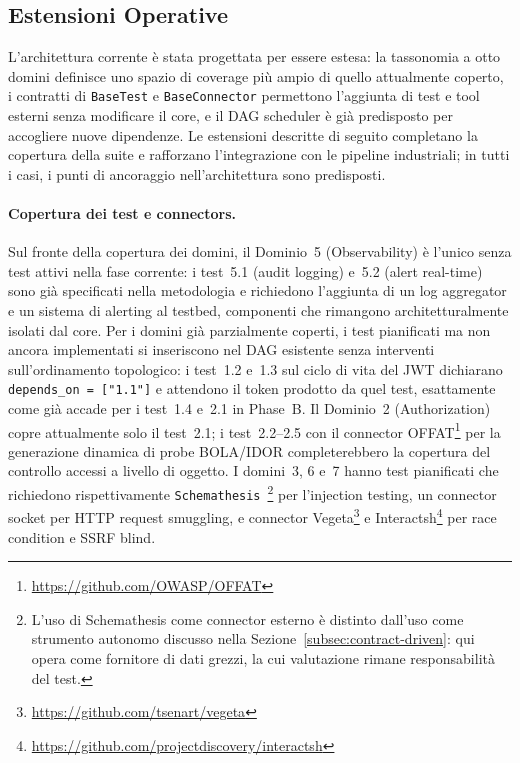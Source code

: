 \subsection{Estensioni Operative}\label{subsec:roadmap-operativa}

L'architettura corrente è stata progettata per essere estesa: la tassonomia a otto domini definisce uno spazio di coverage più ampio di quello attualmente coperto, i contratti di \texttt{BaseTest} e \texttt{BaseConnector} permettono l'aggiunta di test e tool esterni senza modificare il core, e il \gls{DAG} scheduler è già predisposto per accogliere nuove dipendenze. Le estensioni descritte di seguito completano la copertura della suite e rafforzano l'integrazione con le pipeline industriali; in tutti i casi, i punti di ancoraggio nell'architettura sono predisposti.

\paragraph{Copertura dei test e connectors.}
Sul fronte della copertura dei domini, il Dominio~5 (Observability) è l'unico senza test attivi nella fase corrente: i test~5.1 (audit logging) e~5.2 (alert real-time) sono già specificati nella metodologia e richiedono l'aggiunta di un log aggregator e un sistema di alerting al testbed, componenti che rimangono architetturalmente isolati dal core. Per i domini già parzialmente coperti, i test pianificati ma non ancora implementati si inseriscono nel \gls{DAG} esistente senza interventi sull'ordinamento topologico: i test~1.2 e~1.3 sul ciclo di vita del \gls{JWT} dichiarano \texttt{depends\_on~=~["1.1"]} e attendono il token prodotto da quel test, esattamente come già accade per i test~1.4 e~2.1 in Phase~B. Il Dominio~2 (Authorization) copre attualmente solo il test~2.1; i test~2.2--2.5 con il connector OFFAT\footnote{\url{https://github.com/OWASP/OFFAT}} per la generazione dinamica di probe \gls{BOLA}/\gls{IDOR} completerebbero la copertura del controllo accessi a livello di oggetto. I domini~3, 6 e~7 hanno test pianificati che richiedono rispettivamente \texttt{Schemathesis}~\cite{schemathesisDerivingSemanticsawareFuzzers2022}\footnote{L'uso di Schemathesis come connector esterno è distinto dall'uso come strumento autonomo discusso nella Sezione~\ref{subsec:contract-driven}: qui opera come fornitore di dati grezzi, la cui valutazione rimane responsabilità del test.} per l'injection testing, un connector socket per HTTP request smuggling, e connector Vegeta\footnote{\url{https://github.com/tsenart/vegeta}} e Interactsh\footnote{\url{https://github.com/projectdiscovery/interactsh}} per race condition e \gls{SSRF} blind.

